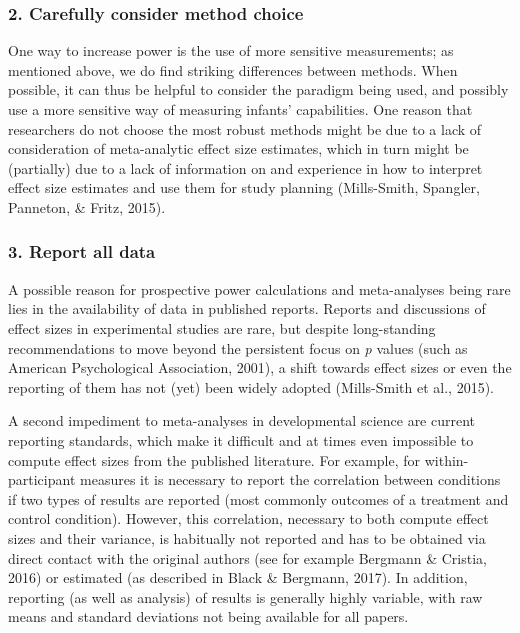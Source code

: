 \documentclass[english,floatsintext,man]{apa6}
\newcounter{author}
\begin{document}
\subsubsection{2. Carefully consider method
choice}\label{carefully-consider-method-choice}

One way to increase power is the use of more sensitive measurements; as
mentioned above, we do find striking differences between methods. When
possible, it can thus be helpful to consider the paradigm being used,
and possibly use a more sensitive way of measuring infants'
capabilities. One reason that researchers do not choose the most robust
methods might be due to a lack of consideration of meta-analytic effect
size estimates, which in turn might be (partially) due to a lack of
information on and experience in how to interpret effect size estimates
and use them for study planning (Mills-Smith, Spangler, Panneton, \&
Fritz, 2015).

\subsubsection{3. Report all data}\label{report-all-data}

A possible reason for prospective power calculations and meta-analyses
being rare lies in the availability of data in published reports.
Reports and discussions of effect sizes in experimental studies are
rare, but despite long-standing recommendations to move beyond the
persistent focus on \emph{p} values (such as American Psychological
Association, 2001), a shift towards effect sizes or even the reporting
of them has not (yet) been widely adopted (Mills-Smith et al., 2015).

A second impediment to meta-analyses in developmental science are
current reporting standards, which make it difficult and at times even
impossible to compute effect sizes from the published literature. For
example, for within-participant measures it is necessary to report the
correlation between conditions if two types of results are reported
(most commonly outcomes of a treatment and control condition). However,
this correlation, necessary to both compute effect sizes and their
variance, is habitually not reported and has to be obtained via direct
contact with the original authors (see for example Bergmann \& Cristia,
2016) or estimated (as described in Black \& Bergmann, 2017). In
addition, reporting (as well as analysis) of results is generally highly
variable, with raw means and standard deviations not being available for
all papers.
\end{document}
